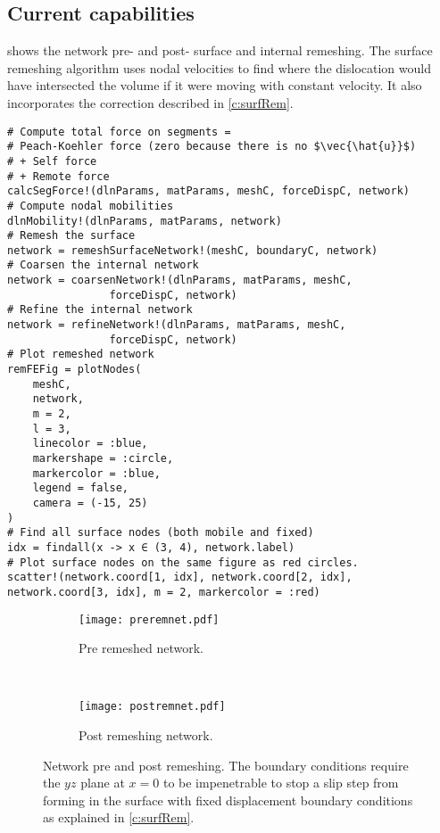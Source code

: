 \subsection{Current capabilities}

 shows the network pre- and post- surface and internal remeshing. The surface remeshing algorithm uses nodal velocities to find where the dislocation would have intersected the volume if it were moving with constant velocity. It also incorporates the correction described in \cref{c:surfRem}.
\begin{verbatim}
# Compute total force on segments = 
# Peach-Koehler force (zero because there is no $\vec{\hat{u}}$)
# + Self force
# + Remote force
calcSegForce!(dlnParams, matParams, meshC, forceDispC, network)
# Compute nodal mobilities
dlnMobility!(dlnParams, matParams, network)
# Remesh the surface
network = remeshSurfaceNetwork!(meshC, boundaryC, network)
# Coarsen the internal network
network = coarsenNetwork!(dlnParams, matParams, meshC, 
                forceDispC, network)
# Refine the internal network
network = refineNetwork!(dlnParams, matParams, meshC, 
                forceDispC, network)
# Plot remeshed network
remFEFig = plotNodes(
    meshC,
    network,
    m = 2,
    l = 3,
    linecolor = :blue,
    markershape = :circle,
    markercolor = :blue,
    legend = false,
    camera = (-15, 25)
)
# Find all surface nodes (both mobile and fixed)
idx = findall(x -> x ∈ (3, 4), network.label)
# Plot surface nodes on the same figure as red circles.
scatter!(network.coord[1, idx], network.coord[2, idx], network.coord[3, idx], m = 2, markercolor = :red)
\end{verbatim}
\begin{figure}
    \centering
    \begin{subfigure}[t]{0.48\linewidth}
        \centering
        \texttt{[image: preremnet.pdf]}
        \caption{Pre remeshed network.}
    \end{subfigure}
    ~
    \begin{subfigure}[t]{0.48\linewidth}
        \centering
        \texttt{[image: postremnet.pdf]}
        \caption{Post remeshing network.}
    \end{subfigure}
    \caption[Network pre and post remeshing.]{Network pre and post remeshing. The boundary conditions require the $yz$ plane at $x=0$ to be impenetrable to stop a slip step from forming in the surface with fixed displacement boundary conditions as explained in \cref{c:surfRem}.}
    \label{f:networkPrePost}
\end{figure}

